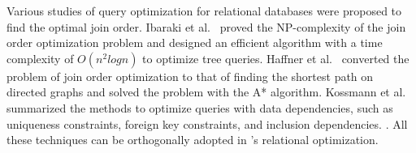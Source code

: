 Various studies of query optimization for relational databases were proposed to find the optimal join order.
Ibaraki et al.~\cite{IbarakiK84} proved the NP-complexity of the join order optimization problem and designed an efficient algorithm with a time complexity of $O(n^2logn)$ to optimize tree queries.
Haffner et al.~\cite{Haffnerjoinorder} converted the problem of join order optimization to that of finding the shortest path on directed graphs and solved the problem with the A* algorithm. 
Kossmann et al.~\cite{data-dependency-join} summarized the methods to optimize queries with data dependencies, such as uniqueness constraints, foreign key constraints, and inclusion dependencies.
.
All these techniques can be orthogonally adopted in \name's relational optimization.

